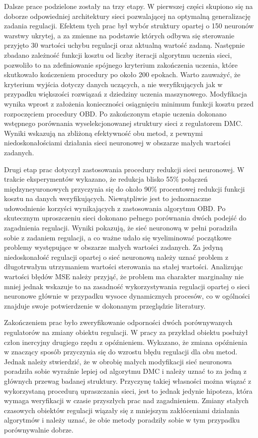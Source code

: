 \par Dalsze prace podzielone zostały na trzy etapy. W pierwszej części skupiono się na doborze odpowiedniej architektury sieci pozwalającej na optymalną generalizację zadania regulacji. Efektem tych prac był wybór struktury opartej o 150 neuronów warstwy ukrytej, a za zmienne na podstawie których odbywa się sterowanie przyjęto 30 wartości uchybu regulacji oraz aktualną wartość zadaną. Następnie zbadano zależność funkcji kosztu od liczby iteracji algorytmu uczenia sieci, pozwoliło to na zdefiniowanie spójnego kryterium zakończenia uczenia, które skutkowało kończeniem procedury po około 200 epokach. Warto zauważyć, że kryterium wyjścia dotyczy danych uczących, a nie weryfikujących jak w przypadku większości rozwiązań z dziedziny uczenia maszynowego. Modyfikacja wynika wprost z założenia konieczności osiągnięciu minimum funkcji kosztu przed rozpoczęciem procedury OBD. Po zakończonym etapie uczenia dokonano wstępnego porównania wyselekcjonowanej struktury sieci z regulatorem DMC. Wyniki wskazują na zbliżoną efektywność obu metod, z pewnymi niedoskonałościami działania sieci neuronowej w obszarze małych wartości zadanych.
\par Drugi etap prac dotyczył zastosowania procedury redukcji sieci neuronowej. W trakcie eksperymentów wykazano, że redukcja blisko 55\% połączeń międzyneyuronowych przyczynia się do około 90\% procentowej redukcji funkcji kosztu na danych weryfikujących. Niewątpliwie jest to jednoznaczne udowodnienie korzyści wynikających z zastosowania algorytmu OBD. Po skutecznym uproszczeniu sieci dokonano pełnego porównania dwóch podejść do zagadnienia regulacji. Wyniki pokazują, że sieć neuronową w pełni poradziła sobie z zadaniem regulacji, a co ważne udało się wyeliminować początkowe problemy występujące w obszarze małych wartości zadanych. Za jedyną niedoskonałość regulacji opartej o sieć neuronową należy uznać problem z długotrwałym utrzymaniem wartości sterowania na stałej wartości. Analizując wartości błędów MSE należy przyjąć, że problem ma charakter marginalny nie mniej jednak wskazuje to na zasadność wykorzystywania regulacji opartej o sieci neuronowe głównie w przypadku wysoce dynamicznych procesów, co w ogólności znajduje swoje potwierdzenie w dokonanym przeglądzie literatury.
\par Zakończeniem prac było zweryfikowanie odporności dwóch porównywanych regulatorów na zmiany obiektu regulacji. W pracy za przykład obiektu posłużył człon inercyjny drugiego rzędu z opóźnieniem. Wykazano, że zmiana opóźnienia w znaczący sposób przyczynia się do wzrostu błędu regulacji dla obu metod. Jednak należy stwierdzić, że w obrobię małych modyfikacji sieć neuronowa poradziła sobie wyraźnie lepiej od algorytmu DMC i należy uznać to za jedną z głównych przewag badanej struktury. Przyczynę takiej własności można wiązać z wykorzystaną procedurą upraszczania sieci, jest to jednak jedynie hipoteza, która wymaga weryfikacji w czasie przyszłych prac nad zagadnieniem. Zmiany stałych czasowych obiektów regulacji wiązały się z mniejszym zakłóceniami działania algorytmów i należy uznać, że obie metody poradziły sobie w tym przypadku porównywalnie dobrze.
